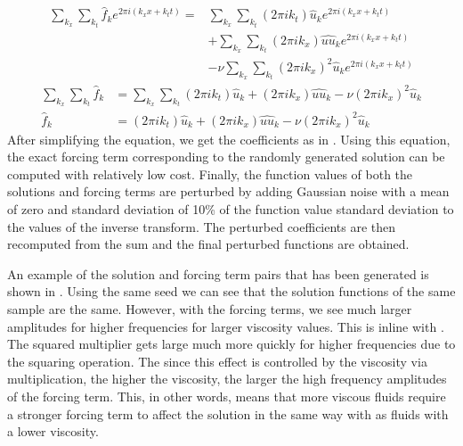 \begin{equation}
  \begin{split}
    \sum_{k_{x}} \sum_{k_{t}} \hat{f}_k e^{2\pi i(k_{x}x+k_{t}t)} =
     & \sum_{k_{x}} \sum_{k_{t}} (2\pi i k_{t}) \hat{u}_k e^{2\pi i(k_{x}x+k_{t}t)}                                                                \\
     & + \sum_{k_{x}} \sum_{k_{t}} (2\pi i k_{x})\hat{uu}_k e^{2\pi i(k_{x}x+k_{t}t)}                                                              \\
     & - \nu\sum_{k_{x}} \sum_{k_{t}} {(2\pi i k_{x})}^2\hat{u}_k e^{2\pi i(k_{x}x+k_{t}t)} \label{eq:forced_viscous_burgers_fourier_substitution}
  \end{split}
\end{equation}
\begin{align}
  \sum_{k_{x}} \sum_{k_{t}} \hat{f}_k & = \sum_{k_{x}} \sum_{k_{t}} (2\pi i k_{t}) \hat{u}_k + (2\pi i k_{x})\hat{uu}_k - \nu{(2\pi i k_{x})}^2\hat{u}_k \label{eq:forced_viscous_burgers_fourier} \\
  \hat{f}_k                           & = (2\pi i k_{t}) \hat{u}_k + (2\pi i k_{x})\hat{uu}_k - \nu{(2\pi i k_{x})}^2\hat{u}_k \label{eq:forced_viscous_burgers_coeff}
\end{align}
After simplifying the equation, we get the coefficients as in . Using this equation, the exact forcing term corresponding to the randomly generated solution can be computed with relatively low cost. Finally, the function values of both the solutions and forcing terms are perturbed by adding Gaussian noise with a mean of zero and standard deviation of 10\% of the function value standard deviation to the values of the inverse transform. The perturbed coefficients are then recomputed from the sum and the final perturbed functions are obtained.

An example of the solution and forcing term pairs that has been generated is shown in . Using the same seed we can see that the solution functions of the same sample are the same. However, with the forcing terms, we see much larger amplitudes for higher frequencies for larger viscosity values. This is inline with . The squared multiplier gets large much more quickly for higher frequencies due to the squaring operation. The since this effect is controlled by the viscosity via multiplication, the higher the viscosity, the larger the high frequency amplitudes of the forcing term. This, in other words, means that more viscous fluids require a stronger forcing term to affect the solution in the same way with as fluids with a lower viscosity.

